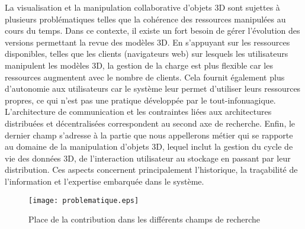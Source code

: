 La visualisation et la manipulation collaborative d'objets \gls{3D} sont sujettes à 
plusieurs problématiques telles que la cohérence des ressources manipulées au 
cours du temps. Dans ce contexte, il existe un fort besoin de gérer l'évolution des 
versions permettant la revue des modèles \gls{3D}. 
En s'appuyant sur les ressources disponibles, telles que les clients (navigateurs 
web) sur lesquels les utilisateurs manipulent les modèles \gls{3D}, la gestion de la charge est 
plus flexible car les ressources augmentent avec le nombre de clients.
Cela fournit également plus d'autonomie aux utilisateurs car le système leur permet d'utiliser
leurs ressources propres, ce qui n'est pas une pratique développée par le tout-infonuagique.
L'architecture de communication et les contraintes liées aux architectures 
distribuées et décentralisées correspondent au second axe de recherche. 
Enfin, le dernier champ 
s'adresse à la partie que nous appellerons \og métier\fg{} qui se rapporte au 
domaine de la manipulation d'objets \gls{3D}, lequel inclut la 
gestion du cycle de vie des données \gls{3D}, de l'interaction utilisateur au 
stockage 
en passant par leur distribution. Ces aspects concernent principalement
l'historique, la traçabilité de l'information et l'expertise embarquée dans le système.

\begin{figure}[hbt]
	\centering
	\texttt{[image: problematique.eps]}
	\caption{Place de la contribution dans les différents champs de recherche}
	\label{fig:problematique}
\end{figure}

